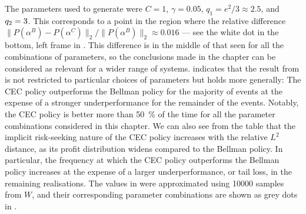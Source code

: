 \documentclass[main.tex]{subfiles}
\begin{document}
The parameters used to generate 
were $C=1$, $\gamma=0.05$, $q_1=e^2/3\approx2.5$, and
$q_2=\nobreak3$. This corresponds to a point
in the region where the relative difference
$\|P(\alpha^B)-P(\alpha^C)\|_2/\|P(\alpha^B)\|_2 \approx 0.016$ ---
see the
white dot in the
bottom, left frame in .
This difference is in the middle of that seen for all the
combinations of parameters, so the conclusions made in the chapter
can be considered as relevant for a wider range of systems.
indicates that the result from  is not restricted
to particular choices of parameters but holds more generally:
The CEC policy
outperforms the Bellman policy for the
majority of events at the expense of a stronger underperformance
for the remainder of the events. Notably, the CEC policy is better
more than \SI{50}{\percent} of the time for all the parameter
combinations considered in this chapter.
We can also see from the table that the implicit risk-seeking nature
of the CEC policy increases with
the relative $L^2$ distance, as its profit distribution widens compared to
the Bellman policy.
In particular, the frequency at which the CEC policy
outperforms the Bellman policy increases at the expense of a larger
underperformance, or tail loss, in the remaining realisations.
The values in  were approximated using \num{10000} samples
from $W$, and their corresponding parameter combinations are shown as
grey dots in .
\end{document}
